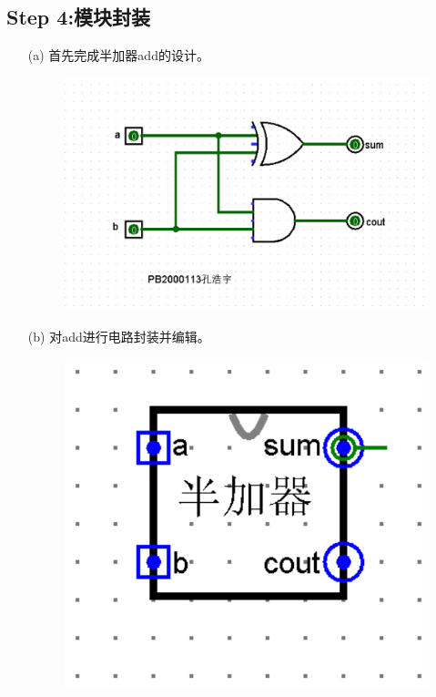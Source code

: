 \documentclass{article}
\begin{document}
		\subsection*{Step 4:模块封装}
		\begin{enumerate}
			\item [(a)]首先完成半加器add的设计。
			\begin{figure}[H]
				\centering
				\includegraphics[scale=0.7]{b-5.png}
			\end{figure}
			\item [(b)]对add进行电路封装并编辑。
			\begin{figure}[H]
				\centering
				\includegraphics[scale=0.7]{b-6.png}

\end{figure}
\end{enumerate}
\end{document}
